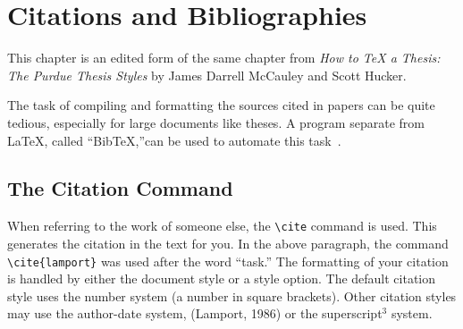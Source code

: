 %
%

\newcommand{\BibTeX}{{\sc Bib}\TeX}

\chapter{Citations and Bibliographies}
This chapter is an edited form of the same chapter from {\em How to 
\TeX{} a Thesis: The Purdue Thesis Styles} by James Darrell McCauley and
Scott Hucker.

The task of compiling and formatting the sources cited in papers can
be quite tedious, especially for large documents like theses.  A program
separate from \LaTeX{}, called ``\BibTeX{},''can be used to automate this task~\cite{lamport}.

\section{The Citation Command}
When referring to the work of someone else, the {\tt \verb|\cite|} command is used.
This generates the citation in the text for you.  In the above paragraph, the command
{\tt \verb|\cite{lamport}|} was used after the word ``task.''  The formatting of your
citation is handled by either the document style or a style option.  The default citation
style uses the number system (a number in square brackets).  Other citation styles
may use the author-date system, (Lamport, 1986) or the superscript$^3$ system.

